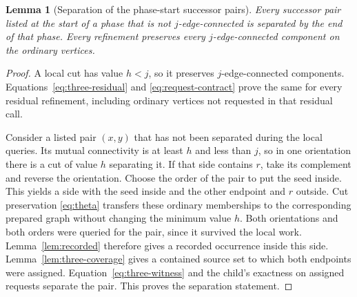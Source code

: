 \documentclass[11pt]{article}
\newtheorem{lemma}[theorem]{Lemma}
\theoremstyle{definition}
\theoremstyle{remark}
\begin{document}
\begin{lemma}[Separation of the phase-start successor pairs]
\label{lem:phase}
Every successor pair listed at the start of a phase that is not \(j\)-edge-connected is separated by the end of that phase. Every refinement preserves every \(j\)-edge-connected component on the ordinary vertices.
\end{lemma}
\begin{proof}
A local cut has value \(h<j\), so it preserves \(j\)-edge-connected components. Equations~\eqref{eq:three-residual} and \eqref{eq:request-contract} prove the same for every residual refinement, including ordinary vertices not requested in that residual call.

Consider a listed pair \((x,y)\) that has not been separated during the local queries. Its mutual connectivity is at least \(h\) and less than \(j\), so in one orientation there is a cut of value \(h\) separating it. If that side contains \(r\), take its complement and reverse the orientation. Choose the order of the pair to put the seed inside. This yields a side with the seed inside and the other endpoint and \(r\) outside. Cut preservation \eqref{eq:theta} transfers these ordinary memberships to the corresponding prepared graph without changing the minimum value \(h\). Both orientations and both orders were queried for the pair, since it survived the local work. Lemma~\ref{lem:recorded} therefore gives a recorded occurrence inside this side. Lemma~\ref{lem:three-coverage} gives a contained source set to which both endpoints were assigned. Equation~\eqref{eq:three-witness} and the child's exactness on assigned requests separate the pair. This proves the separation statement.
\end{proof}
\end{document}
